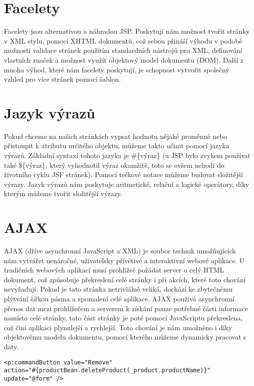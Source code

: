 \documentclass[122pt,oneside]{fithesis}
\begin{document}
\section{Facelety}
Facelety jsou alternativou a náhradou JSP. Poskytují nám možnost tvořit stránky v XML stylu, pomocí XHTML dokumentů, což sebou přináší výhodu v podobě možnosti validace stránek použitím standardních nástrojů pro XML, definování vlastních značek a možnost využít objektový model dokumentu (DOM). Další z mnoha výhod, které nám facelety poskytují, je schopnost vytvořit společný vzhled pro více stránek pomocí šablon. 

\section{Jazyk výrazů}
Pokud chceme na našich stránkách vypsat hodnotu nějaké proměnné nebo přistoupit k atributu určitého objektu, můžeme takto učinit pomocí jazyka výrazů. Základní syntaxí tohoto jazyka je \#\{výraz\} (u JSP bylo zvykem používat také \$\{výraz\}, který vyhodnotil výraz okamžitě, toto se ovšem nehodí do životního cyklu JSF stránek). Pomocí tečkové notace můžeme budovat složitější výrazy. Jazyk výrazů nám poskytuje aritmetické, relační a logické operátory, díky kterým můžeme tvořit složitější výrazy.

\section{AJAX}
AJAX (dříve asynchronní JavaScript a XML) je soubor technik umožňujících nám vytvářet nenáročné, uživatelsky přívětivé a interaktivní webové aplikace. U tradičních webových aplikací musí prohlížeč požádat server o celý HTML dokument, což způsobuje překreslení celé stránky i při akcích, které toto chování nevyžadují. Pokud je tato stránka netriviálně veliká, dochází ke zbytečnému plýtvání šířkou pásma a zpomalení celé aplikace. AJAX používá asynchronní přenos dat mezi prohlížečem a serverem k získání pouze potřebné části informace namísto celé stránky, tato část stránky je poté pomocí JavaScriptu překreslena, což činí aplikaci plynulejší a rychlejší. Toto chování je nám umožněno i díky objektovému modelu dokumentu, pomocí kterého můžeme dynamicky pracovat s daty.

\begin{lstlisting}
<p:commandButton value="Remove" 
action="#{productBean.deleteProduct(_product.productName)}"
update="@form" />
\end{lstlisting}
\end{document}
